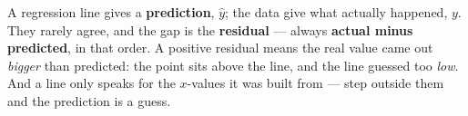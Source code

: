 \documentclass[12pt]{article}
\begin{document}
\vspace{0.14in}

\boxguard[8]
\begin{remindbox}
\small
A regression line gives a \textbf{prediction}, $\hat{y}$; the data give what actually
happened, $y$. They rarely agree, and the gap is the \textbf{residual} --- always
\textbf{actual minus predicted}, in that order. A positive residual means the real value came
out \emph{bigger} than predicted: the point sits above the line, and the line guessed too
\emph{low}. And a line only speaks for the $x$-values it was built from --- step outside them
and the prediction is a guess.
\end{remindbox}
\end{document}
